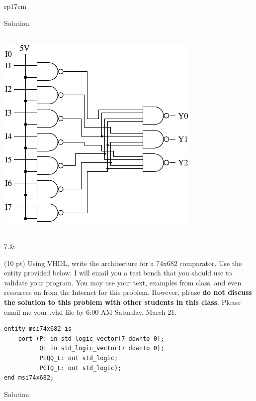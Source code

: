 \documentclass{article}
\begin{document}
\begin{longtable}[l]{rp{17cm}}
\begin{minipage}[t]{\linewidth}
Solution: \\ \\
\begin{center}
  \includegraphics{../Encoders/Assessments/BinaryEncoderLogicSolution}
\end{center}
\end{minipage}\\
\medskip
7.&\begin{minipage}[t]{\linewidth}(10 pt) Using VHDL, write the architecture for a 74x682 comparator.  Use the entity provided below.  I will email you a test bench that you should use to validate your program.  You may use your text, examples from class, and even resources on from the Internet for this problem.  However, please \textbf{do not discuss the solution to this problem with other students in this class}.  Please email me your .vhd file by 6:00 AM Saturday, March 21.
\lstset{language=VHDL}
\begin{lstlisting}
entity msi74x682 is
    port (P: in std_logic_vector(7 downto 0);
          Q: in std_logic_vector(7 downto 0);
          PEQQ_L: out std_logic;
          PGTQ_L: out std_logic);
end msi74x682;
\end{lstlisting}

Solution: \\ \\

\end{minipage}\\
\medskip
\end{longtable}
\end{document}
